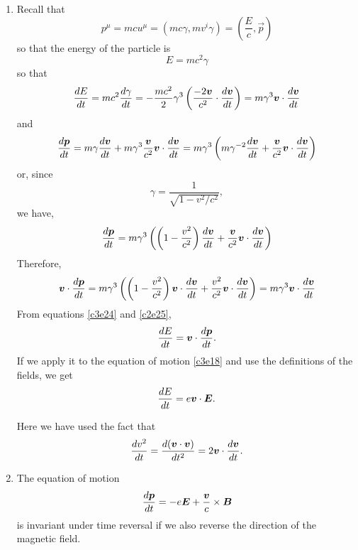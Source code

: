 \begin{enumerate}
\item Recall that 
\begin{equation}\label{c3e22}
p^\mu = mcu^\mu = (mc\gamma, mv^i\gamma) = \left(\frac{E}{c}, \vec{p}\right)
\end{equation}
so that the energy of the particle is
\begin{equation}\label{c3e23}
E = mc^2\gamma
\end{equation}
so that
\begin{equation}\label{c3e24}
\frac{d{E}}{d{t}} = mc^2\frac{d{\gamma}}{d{t}} = 
-\frac{mc^2}{2}\gamma^3\left(\frac{-2\boldsymbol{v}}{c^2}\cdot\frac{d{\boldsymbol{v}}}{d{t}}\right)
= m\gamma^3 \boldsymbol{v}\cdot\frac{d{\boldsymbol{v}}}{d{t}}
\end{equation}
and
\[
\frac{d{\boldsymbol{p}}}{d{t}} = m\gamma\frac{d{\boldsymbol{v}}}{d{t}} + m\gamma^3\frac{\boldsymbol{v}}{c^2}\boldsymbol{v}\cdot\frac{d{\boldsymbol{v}}}{d{t}} = 
m\gamma^3\left(m\gamma^{-2}\frac{d{\boldsymbol{v}}}{d{t}} + \frac{\boldsymbol{v}}{c^2}\boldsymbol{v}\cdot\frac{d{\boldsymbol{v}}}{d{t}}\right)
\]
or, since
\[
\gamma = \frac{1}{\sqrt{1 - v^2/c^2}},
\]
we have,
\[
\frac{d{\boldsymbol{p}}}{d{t}} = m\gamma^3\left(\left(1 - \frac{v^2}{c^2}\right)\frac{d{\boldsymbol{v}}}{d{t}} + 
\frac{\boldsymbol{v}}{c^2}\boldsymbol{v}\cdot\frac{d{\boldsymbol{v}}}{d{t}}\right)
\]
Therefore,
\begin{equation}\label{c3e25}
\boldsymbol{v}\cdot\frac{d{\boldsymbol{p}}}{d{t}} = m\gamma^3\left(\left(1 - \frac{v^2}{c^2}\right)\boldsymbol{v}\cdot\frac{d{\boldsymbol{v}}}{d{t}}
+ \frac{v^2}{c^2}\boldsymbol{v}\cdot\frac{d{\boldsymbol{v}}}{d{t}}\right) = m\gamma^3\boldsymbol{v}\cdot\frac{d{\boldsymbol{v}}}{d{t}}
\end{equation}
From equations \eqref{c3e24} and \eqref{c2e25},
\begin{equation}\label{c3e26}
\frac{d{E}}{d{t}} = \boldsymbol{v}\cdot\frac{d{\boldsymbol{p}}}{d{t}}.
\end{equation}
If we apply it to the equation of motion \eqref{c3e18} and use the definitions 
of the fields, we get
\begin{equation}\label{c3e27}
\frac{d{E}}{d{t}} = e\boldsymbol{v}\cdot\boldsymbol{E}.
\end{equation}

Here we have used the fact that
\begin{equation}\label{c3e28}
\frac{d{v^2}}{d{t}} = \frac{d{(\boldsymbol{v}\cdot\boldsymbol{v})}}{d{t^2}} = 2\boldsymbol{v}\cdot\frac{d{\boldsymbol{v}}}{d{t}}.
\end{equation}

\item The equation of motion
\begin{equation}\label{c3e29}
\frac{d{\boldsymbol{p}}}{d{t}} = -e\boldsymbol{E} + \frac{\boldsymbol{v}}{c}\times\boldsymbol{B}
\end{equation}
is invariant under time reversal if we also reverse the direction of the magnetic
field.


\end{enumerate}
